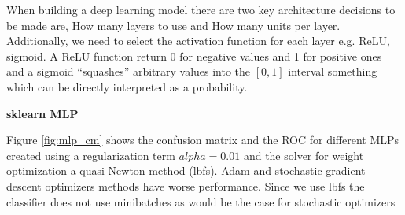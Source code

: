\documentclass[11pt]{article}
\theoremstyle{definition}
\theoremstyle{remark}
\begin{document}
When building a deep learning model there are two key architecture decisions to be made are, How many layers to use and How many units per layer. Additionally, we need to select the activation function for each layer e.g. ReLU, sigmoid. A ReLU function return 0 for negative values and 1 for positive ones and a sigmoid “squashes” arbitrary values into the $[0, 1]$ interval something which can be directly interpreted as a probability.

\textbf{sklearn MLP}

Figure \ref{fig:mlp_cm} shows the confusion matrix and the ROC for different MLPs created using a regularization term $alpha = 0.01$ and the solver for weight optimization a quasi-Newton method (lbfs). Adam and stochastic gradient descent optimizers methods have worse performance. Since we use lbfs the classifier does not use minibatches as would be the case for stochastic optimizers
\end{document}
